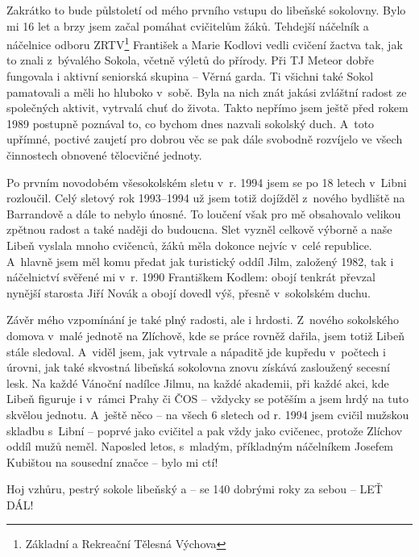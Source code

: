 \documentclass[11pt]{article}
\begin{document}
Zakrátko to bude půlstoletí od mého prvního vstupu do libeňské sokolovny. Bylo mi 16 let a brzy jsem začal pomáhat cvičitelům žáků. Tehdejší náčelník a náčelnice odboru ZRTV\footnote{Základní a Rekreační Tělesná Výchova} František a Marie Kodlovi vedli cvičení žactva tak, jak to znali z~bývalého Sokola, včetně výletů do přírody. Při TJ Meteor dobře fungovala i aktivní seniorská skupina – Věrná garda. Ti všichni také Sokol pamatovali a měli ho hluboko v~sobě. Byla na nich znát jakási zvláštní radost ze společných aktivit, vytrvalá chuť do života. Takto nepřímo jsem ještě před rokem 1989 postupně poznával to, co bychom dnes nazvali sokolský duch. A~toto upřímné, poctivé zaujetí pro dobrou věc se pak dále svobodně rozvíjelo ve všech činnostech obnovené tělocvičné jednoty.

Po prvním novodobém všesokolském sletu v~r. 1994 jsem se po 18 letech v~Libni rozloučil. Celý sletový rok 1993–1994 už jsem totiž dojížděl z~nového bydliště na Barrandově a dále to nebylo únosné. To loučení však pro mě obsahovalo velikou zpětnou radost a také naději do budoucna. Slet vyzněl celkově výborně a naše Libeň vyslala mnoho cvičenců, žáků měla dokonce nejvíc v~celé republice. A~hlavně jsem měl komu předat jak turistický oddíl Jilm, založený 1982, tak i náčelnictví svěřené mi v~r. 1990 Františkem Kodlem: obojí tenkrát převzal nynější starosta Jiří Novák a obojí dovedl výš, přesně v~sokolském duchu.

Závěr mého vzpomínání je také plný radosti, ale i hrdosti. Z~nového sokolského domova v~malé jednotě na Zlíchově, kde se práce rovněž dařila, jsem totiž Libeň stále sledoval. A~viděl jsem, jak vytrvale a nápaditě jde kupředu v~počtech i úrovni, jak také skvostná libeňská sokolovna znovu získává zasloužený secesní lesk. Na každé Vánoční nadílce Jilmu, na každé akademii, při každé akci, kde Libeň figuruje i v~rámci Prahy či ČOS – vždycky se potěším a jsem hrdý na tuto skvělou jednotu. A~ještě něco – na všech 6 sletech od r. 1994 jsem cvičil mužskou skladbu s~Libní – poprvé jako cvičitel a pak vždy jako cvičenec, protože Zlíchov oddíl mužů neměl. Naposled letos, s~mladým, příkladným náčelníkem Josefem Kubištou na sousední značce – bylo mi ctí!

\vspace*{\baselineskip}
\noindent
Hoj vzhůru, pestrý sokole libeňský a – se 140 dobrými roky za sebou – LEŤ DÁL! 


\clearpage


\pagecolor{sokolred}
\color{white}
\renewcommand{\arraystretch}{1.2}
\end{document}
